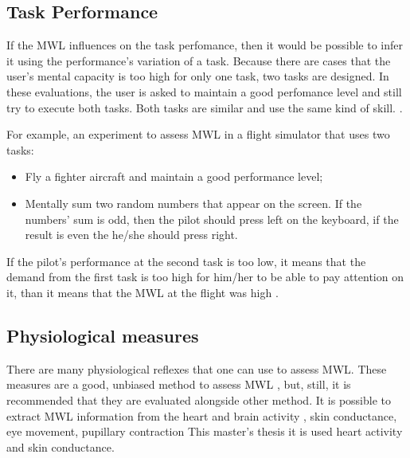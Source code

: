        
    
    \subsection{Task Performance}
    \label{subsec:task_performance}
    
        If the MWL influences on the task perfomance, then it would be possible to infer it using the performance's variation of a task. Because there are cases that the user's mental capacity is too high for only one task, two tasks are designed. In these evaluations, the user is asked to maintain a good perfomance level and still try to execute both tasks. Both tasks are similar and use the same kind of skill. \cite{stanton2004handbook, sanders1998human}.
        
        For example, an experiment to assess MWL in a flight simulator that uses two tasks:
        \begin{itemize}
            \item Fly a fighter aircraft and maintain a good performance level;
            \item Mentally sum two random numbers that appear on the screen. If the numbers' sum is odd, then the pilot should press left on the keyboard, if the result is even the he/she should press right.
        \end{itemize} 
    
        If the pilot's performance at the second task is too low, it means that the demand from the first task is too high for him/her to be able to pay attention on it, than it means that the MWL at the flight was high \cite{mohanavelu2020cognitive}.
        
    \subsection{Physiological measures}
    \label{subsec:physiological_measures}
    
        There are many physiological reflexes that one can use to assess MWL. These measures are a good, unbiased method to assess MWL \cite{fallahi2016effects}, but, still, it is recommended that they are evaluated alongside other method. It is possible to extract MWL information from the heart and brain activity \cite{chakladar2020eeg, orlandi2018measuring}, skin conductance, eye movement, pupillary contraction \cite{stanton2004handbook, rodriguez2015pupillometry} This master's thesis it is used heart activity and skin conductance.
        
